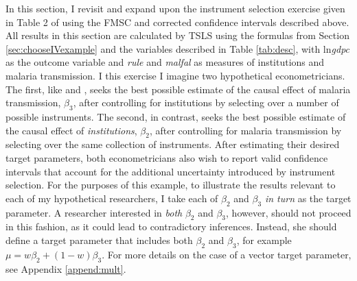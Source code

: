 In this section, I revisit and expand upon the instrument selection exercise given in Table 2 of \cite{Carstensen2006} using the FMSC and corrected confidence intervals described above. 
All results in this section are calculated by TSLS using the formulas from Section \ref{sec:chooseIVexample} and the variables described in Table \ref{tab:desc}, with ln\emph{gdpc} as the outcome  variable and \emph{rule} and \emph{malfal} as measures of institutions and malaria transmission.
I this exercise I imagine two hypothetical econometricians.
The first, like \cite{Sachs} and \cite{Carstensen2006}, seeks the best possible estimate of the causal effect of malaria transmission, $\beta_3$, after controlling for institutions by selecting over a number of possible instruments.
The second, in contrast, seeks the best possible estimate of the causal effect of \emph{institutions}, $\beta_2$, after controlling for malaria transmission by selecting over the same collection of instruments.
After estimating their desired target parameters, both econometricians also wish to report valid confidence intervals that account for the additional uncertainty introduced by instrument selection.
For the purposes of this example, to illustrate the results relevant to each of my hypothetical researchers, I take each of $\beta_2$ and $\beta_3$ \emph{in turn} as the target parameter. 
A researcher interested in \emph{both} $\beta_2$ and $\beta_3$, however, should not proceed in this fashion, as it could lead to contradictory inferences. 
Instead, she should define a target parameter that includes both $\beta_2$ and $\beta_3$, for example $\mu = w \beta_2 + (1-w)\beta_3$. For more details on the case of a vector target parameter, see Appendix \ref{append:mult}.


